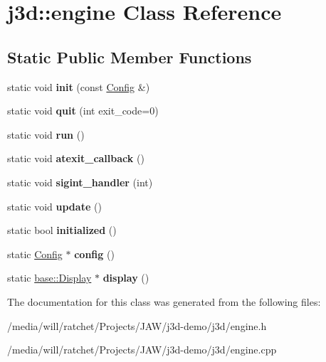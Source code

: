 \hypertarget{classj3d_1_1engine}{}\section{j3d\+:\+:engine Class Reference}
\label{classj3d_1_1engine}
\subsection*{Static Public Member Functions}
\begin{DoxyCompactItemize}
\item 
\hypertarget{classj3d_1_1engine_aa554515fcafe40456ade1ecfe75ce7a6}{}static void {\bfseries init} (const \hyperlink{structj3d_1_1Config}{Config} \&)\label{classj3d_1_1engine_aa554515fcafe40456ade1ecfe75ce7a6}

\item 
\hypertarget{classj3d_1_1engine_a1828719b041858237f4c9bdf239eb911}{}static void {\bfseries quit} (int exit\+\_\+code=0)\label{classj3d_1_1engine_a1828719b041858237f4c9bdf239eb911}

\item 
\hypertarget{classj3d_1_1engine_a6ecc5e83a4e77eb359d0f9ad5239dd0d}{}static void {\bfseries run} ()\label{classj3d_1_1engine_a6ecc5e83a4e77eb359d0f9ad5239dd0d}

\item 
\hypertarget{classj3d_1_1engine_ac43220a1d72ecc64816d622507e782a1}{}static void {\bfseries atexit\+\_\+callback} ()\label{classj3d_1_1engine_ac43220a1d72ecc64816d622507e782a1}

\item 
\hypertarget{classj3d_1_1engine_aef0f91b305894f598dff9b0fd083dba9}{}static void {\bfseries sigint\+\_\+handler} (int)\label{classj3d_1_1engine_aef0f91b305894f598dff9b0fd083dba9}

\item 
\hypertarget{classj3d_1_1engine_a5bd62153776fc7e3e9506abc77c94c6a}{}static void {\bfseries update} ()\label{classj3d_1_1engine_a5bd62153776fc7e3e9506abc77c94c6a}

\item 
\hypertarget{classj3d_1_1engine_af71acaa1ef5bf7ccecf1bd3b668fe810}{}static bool {\bfseries initialized} ()\label{classj3d_1_1engine_af71acaa1ef5bf7ccecf1bd3b668fe810}

\item 
\hypertarget{classj3d_1_1engine_af54420f4bbf86ad0cb485cde01eaaf78}{}static \hyperlink{structj3d_1_1Config}{Config} $\ast$ {\bfseries config} ()\label{classj3d_1_1engine_af54420f4bbf86ad0cb485cde01eaaf78}

\item 
\hypertarget{classj3d_1_1engine_a150b65cbbf2ebf49090f489f266bbe54}{}static \hyperlink{classj3d_1_1base_1_1Display}{base\+::\+Display} $\ast$ {\bfseries display} ()\label{classj3d_1_1engine_a150b65cbbf2ebf49090f489f266bbe54}

\end{DoxyCompactItemize}


The documentation for this class was generated from the following files\+:\begin{DoxyCompactItemize}
\item 
/media/will/ratchet/\+Projects/\+J\+A\+W/j3d-\/demo/j3d/engine.\+h\item 
/media/will/ratchet/\+Projects/\+J\+A\+W/j3d-\/demo/j3d/engine.\+cpp\end{DoxyCompactItemize}
